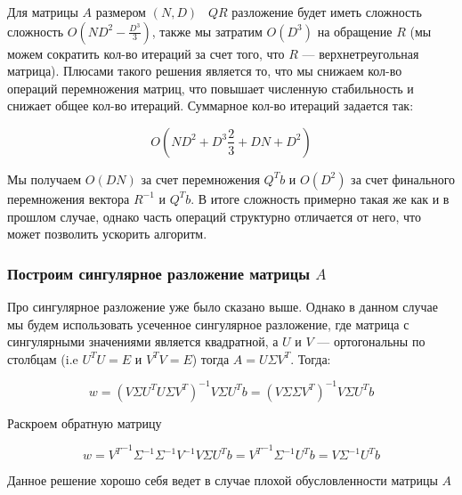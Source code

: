 \documentclass{article}
\begin{document}
    Для матрицы $A$ размером $(N, D)$ \ $QR$ разложение будет иметь сложность сложность $O(ND^{2} - \frac{D^{3}}{3})$,
    также мы затратим $O(D^{3})$ на обращение $R$ (мы можем сократить кол-во итераций за счет того, что $R$ --- верхнетреугольная матрица).
    Плюсами такого решения является то, что мы снижаем кол-во операций перемножения матриц, что повышает численную стабильность
    и снижает общее кол-во итераций.
    Суммарное кол-во итераций задается так:

    \begin{equation}
        O(ND^{2} + D^{3}  \frac{2}{3} + DN + D^{2})
    \end{equation}

    Мы получаем $O(DN)$ за счет перемножения $Q^{T} b$ и $O(D^{2})$ за счет финального перемножения вектора $R^{-1}$ и $Q^{T} b$.
    В итоге сложность примерно такая же как и в прошлом случае, однако часть операций структурно отличается от него, что может позволить ускорить
    алгоритм.


    \subsubsection{Построим сингулярное разложение матрицы $A$}


    Про сингулярное разложение уже было сказано выше.
    Однако в данном случае мы будем использовать усеченное сингулярное разложение, где матрица с сингулярными значениями
    является квадратной, а $U$ и $V$ --- ортогональны по столбцам (i.e $U^{T}U = E$ и $V^{T}V = E$) тогда $A = U \Sigma V^{T} $.
    Тогда:

    \begin{equation}
        w = (V \Sigma U^{T} U \Sigma V^{T})^{-1} V \Sigma U^{T} b = (V \Sigma \Sigma V^{T})^{-1} V \Sigma U^{T} b
    \end{equation}

    Раскроем обратную матрицу

    \begin{equation}
        w = {V^{T}}^{-1} \Sigma^{-1} \Sigma^{-1} V^{-1} V \Sigma U^{T} b = {V^{T}}^{-1} \Sigma^{-1}  U^{T} b = V \Sigma^{-1}  U^{T} b
    \end{equation}

    Данное решение хорошо себя ведет в случае плохой обусловленности матрицы $A$
\end{document}
